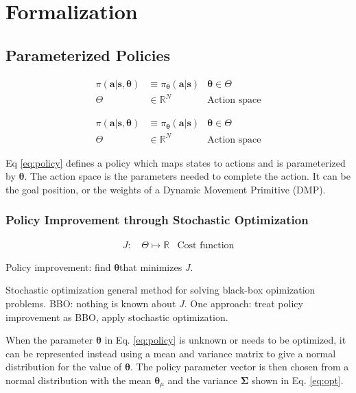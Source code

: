 \documentclass[12pt]{article}
\newcommand{\act}    {\ensuremath{\mathbf{a}}}
\newcommand{\sta}    {\ensuremath{\mathbf{s}}}
\newcommand{\appsp}  {\ensuremath{\Theta}}
\newcommand{\costf}  {\ensuremath{J}}
\newcommand{\app}    {\ensuremath{\bm{\theta}}}
\newcommand{\covar}  {\ensuremath{\bm{\Sigma}}}
\begin{document}
\section{Formalization}

\subsection{Parameterized Policies}

\begin{align}
\label{eq:policy}\pi(\act|\sta,\app) &\equiv  \pi_{\app}(\act|\sta) & \app \in \appsp \\
\appsp &\in \mathbb{R}^N & \mbox{Action space}
\end{align}

\begin{align}
\label{eq:policy}\pi(\act|\sta,\app) &\equiv  \pi_{\app}(\act|\sta) & \app \in \appsp \\
\appsp &\in \mathbb{R}^N & \mbox{Action space}
\end{align}

Eq \ref{eq:policy} defines a policy which maps states to actions and is parameterized by $\app$. The action space is the parameters needed to complete the action. It can be the goal position, or the weights of a Dynamic Movement Primitive (DMP).

\subsubsection{Policy Improvement through Stochastic Optimization}

\begin{align}
\costf\mbox{: } &\label{eq:cost} \appsp \mapsto \mathbb{R}&\mbox{Cost function}
\end{align}

Policy improvement: find \app that minimizes \costf.

Stochastic optimization general method for solving black-box opimization problems. BBO: nothing is known about \costf. One approach: treat policy improvement as BBO, apply stochastic optimization.

When the parameter $\app$ in Eq. \ref{eq:policy} is unknown or needs to be optimized, it can be represented instead using a mean and variance matrix to give a normal distribution for the value of $\app$. The policy parameter vector is then chosen from a normal distribution with the mean $\app_\mu$ and the variance $\covar$ shown in Eq. \ref{eq:opt}.
\end{document}
